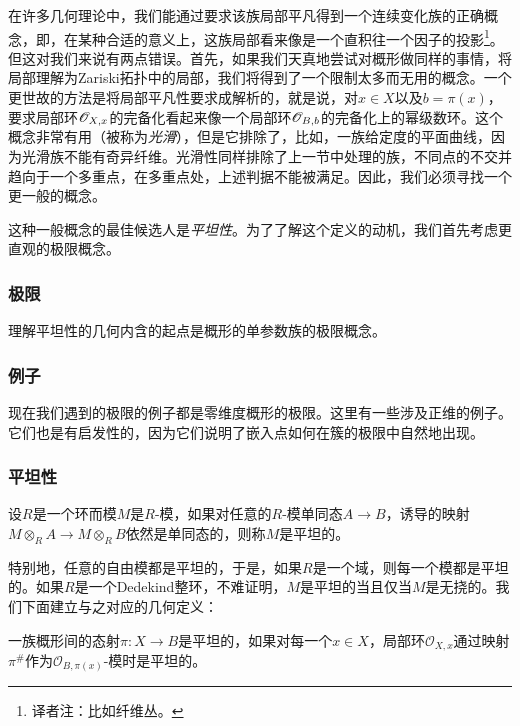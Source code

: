 在许多几何理论中，我们能通过要求该族局部平凡得到一个连续变化族的正确概念，即，在某种合适的意义上，这族局部看来像是一个直积往一个因子的投影\footnote{译者注：比如纤维丛。}。但这对我们来说有两点错误。首先，如果我们天真地尝试对概形做同样的事情，将局部理解为Zariski拓扑中的局部，我们将得到了一个限制太多而无用的概念。一个更世故\nottran 的方法是将局部平凡性要求成解析的，就是说，对$x\in X$以及$b=\pi(x)$，要求局部环$\mathscr{O}_{X,x}$的完备化看起来像一个局部环$\mathscr{O}_{B,b}$的完备化上的幂级数环。这个概念非常有用（被称为\textit{光滑}），但是它排除了，比如，一族给定度的平面曲线，因为光滑族不能有奇异纤维。光滑性同样排除了上一节中处理的族，不同点的不交并趋向于一个多重点，在多重点处，上述判据不能被满足。因此，我们必须寻找一个更一般的概念。

这种一般概念的最佳候选人是\textit{平坦性}。为了了解这个定义的动机，我们首先考虑更直观的极限概念。

\subsubsection*{极限}

理解平坦性的几何内含的起点是概形的单参数族的极限概念。

\subsubsection*{例子}

现在我们遇到的极限的例子都是零维度概形的极限。这里有一些涉及正维的例子。 它们也是有启发性的，因为它们说明了嵌入点如何在簇的极限中自然地出现。

\subsubsection*{平坦性}

\begin{defi}
	设$R$是一个环而模$M$是$R$-模，如果对任意的$R$-模单同态$A\to B$，诱导的映射$M\otimes_R A\to M\otimes_R B$依然是单同态的，则称$M$是平坦的。
\end{defi}

特别地，任意的自由模都是平坦的，于是，如果$R$是一个域，则每一个模都是平坦的。如果$R$是一个Dedekind整环，不难证明，$M$是平坦的当且仅当$M$是无挠的。我们下面建立与之对应的几何定义：

\begin{defi}
	一族概形间的态射$\pi:X\to B$是平坦的，如果对每一个$x\in X$，局部环$\mathscr{O}_{X,x}$通过映射$\pi^\#$作为$\mathscr{O}_{B,\pi(x)}$-模时是平坦的。
\end{defi}

